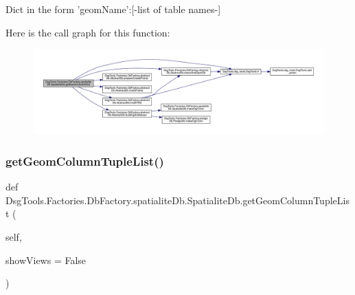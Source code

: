 \begin{DoxyVerb}Dict in the form 'geomName':[-list of table names-]
\end{DoxyVerb}
 Here is the call graph for this function\+:
\nopagebreak
\begin{figure}[H]
\begin{center}
\leavevmode
\includegraphics[width=350pt]{class_dsg_tools_1_1_factories_1_1_db_factory_1_1spatialite_db_1_1_spatialite_db_a06f70db683df58068e3a98c3a540ebba_cgraph}
\end{center}
\end{figure}
\mbox{\label{class_dsg_tools_1_1_factories_1_1_db_factory_1_1spatialite_db_1_1_spatialite_db_a411711f692f22e812ba5323c5e5713f7}} 
\subsubsection{\texorpdfstring{get\+Geom\+Column\+Tuple\+List()}{getGeomColumnTupleList()}}
{\footnotesize\ttfamily def Dsg\+Tools.\+Factories.\+Db\+Factory.\+spatialite\+Db.\+Spatialite\+Db.\+get\+Geom\+Column\+Tuple\+List (\begin{DoxyParamCaption}\item[{}]{self,  }\item[{}]{show\+Views = {\ttfamily False} }\end{DoxyParamCaption})}

